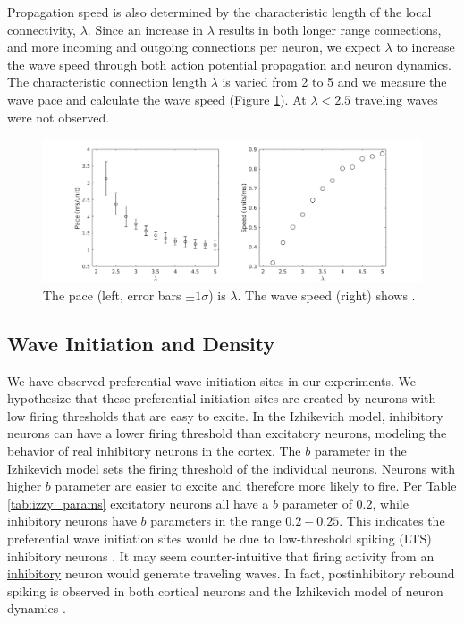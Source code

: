 \documentclass[a4paper,11pt]{article}
\begin{document}
\FloatBarrier

Propagation speed is also determined by the characteristic length of the local connectivity, $\lambda$.
Since an increase in $\lambda$ results in both longer range connections, and more incoming and outgoing connections per neuron, we expect $\lambda$ to increase the wave speed through both action potential propagation and neuron dynamics.
The characteristic connection length $\lambda$ is varied from 2 to 5 and we measure the wave pace and calculate the wave speed (Figure \ref{fig:delay_lambda}).
At $\lambda<2.5$ traveling waves were not observed.
\begin{figure}[!htb]
 \caption{ The pace (left, error bars $\pm 1 \sigma$) is  $\lambda$. The wave speed (right) shows . }
 \label{fig:delay_lambda}
 \centering
   \includegraphics[width=\textwidth]{fig/WaveSpeed_Lambda}
\end{figure}

\FloatBarrier


\subsection{Wave Initiation and Density} \label{sub:wave_initiation}
We have observed preferential wave initiation sites in our experiments.
We hypothesize that these preferential initiation sites are created by neurons with low firing thresholds that are easy to excite.
In the Izhikevich model, inhibitory neurons can have a lower firing threshold than excitatory neurons, modeling the behavior of real inhibitory neurons in the cortex\cite{gibson2009}.
The $b$ parameter in the Izhikevich model sets the firing threshold of the individual neurons.
Neurons with higher $b$ parameter are easier to excite and therefore more likely to fire.
Per Table \ref{tab:izzy_params} excitatory neurons all have a $b$ parameter of $0.2$, while inhibitory neurons have $b$ parameters in the range $0.2-0.25$.
This indicates the preferential wave initiation sites would be due to low-threshold spiking (LTS) inhibitory neurons \cite{izhikevich2003}.
It may seem counter-intuitive that firing activity from an \underline{inhibitory} neuron would generate traveling waves.
In fact, postinhibitory rebound spiking is observed in both cortical neurons \cite{ascoli2010} and the Izhikevich model of neuron dynamics \cite{izhikevich}.
\end{document}
